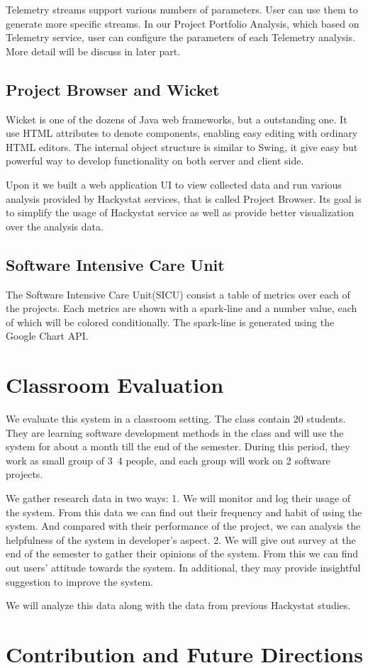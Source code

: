 Telemetry streams support various numbers of parameters. User can use them to generate more specific streams. In our Project Portfolio Analysis, which based on Telemetry service, user can configure the parameters of each Telemetry analysis. More detail will be discuss in later part.

\section {Project Browser and Wicket}
Wicket is one of the dozens of Java web frameworks, but a outstanding one. It use HTML attributes to denote components, enabling easy editing with ordinary HTML editors. The internal object structure is similar to Swing, it give easy but powerful way to develop functionality on both server and client side.

Upon it we built a web application UI to view collected data and run various analysis provided by Hackystat services, that is called Project Browser. Its goal is to simplify the usage of Hackystat service as well as provide better visualization over the analysis data.


\section {Software Intensive Care Unit}
The Software Intensive Care Unit(SICU) consist a table of metrics over each of the projects. Each metrics are shown with a spark-line and a number value, each of which will be colored conditionally. The spark-line is generated using the Google Chart API.\cite{googlechart}

\chapter{Classroom Evaluation}
We evaluate this system in a classroom setting. The class contain 20 students. They are learning software development methods in the class and will use the system for about a month till the end of the semester. During this period, they work as small group of 3~4 people, and each group will work on 2 software projects.

We gather research data in two ways:
	1. We will monitor and log their usage of the system. From this data we can find out their frequency and habit of using the system. And compared with their performance of the project, we can analysis the helpfulness of the system in developer's aspect. 
	2. We will give out survey at the end of the semester to gather their opinions of the system. From this we can find out users' attitude towards the system. In additional, they may provide insightful suggestion to improve the system.

We will analyze this data along with the data from previous Hackystat studies.

\chapter{Contribution and Future Directions}
